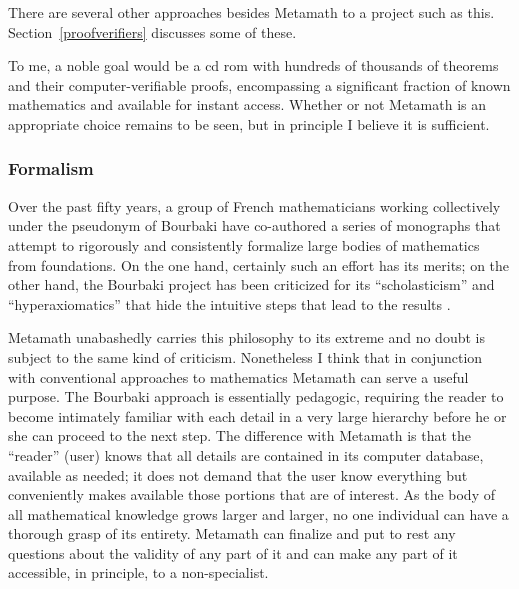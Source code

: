 There are several other approaches besides Metamath to a project such
as this.  Section~\ref{proofverifiers} discusses some of these.

To me, a noble goal would be a {\sc cd rom} with hundreds of thousands of
theorems and their computer-verifiable proofs, encompassing a significant
fraction of known mathematics and available for instant access.  Whether or
not Metamath is an appropriate choice remains to be seen, but in
principle I believe it is sufficient.

\subsubsection{Formalism}

Over the past fifty years, a group of French mathematicians working
collectively under the pseudonym of Bourbaki have
co-authored a series of monographs that attempt to rigorously and
consistently formalize large bodies of mathematics from foundations.  On the
one hand, certainly such an effort has its merits; on the other hand, the
Bourbaki project has been criticized for its ``scholasticism'' and
``hyperaxiomatics'' that hide the intuitive steps that lead to the results
\cite[p.~191]{Barrow}.

Metamath unabashedly carries this philosophy to its extreme and no doubt is
subject to the same kind of criticism.  Nonetheless I think that in
conjunction with conventional approaches to mathematics Metamath can serve a
useful purpose.  The Bourbaki approach is essentially pedagogic, requiring the
reader to become intimately familiar with each detail in a very large
hierarchy before he or she can proceed to the next step.  The difference with
Metamath is that the ``reader'' (user) knows that all details are contained in
its computer database, available as needed; it does not demand that the user
know everything but conveniently makes available those portions that are of
interest.  As the body of all mathematical knowledge grows larger and larger,
no one individual can have a thorough grasp of its entirety.  Metamath
can finalize and put to rest any questions about the validity of any part of it
and can make any part of it accessible, in principle, to a non-specialist.

